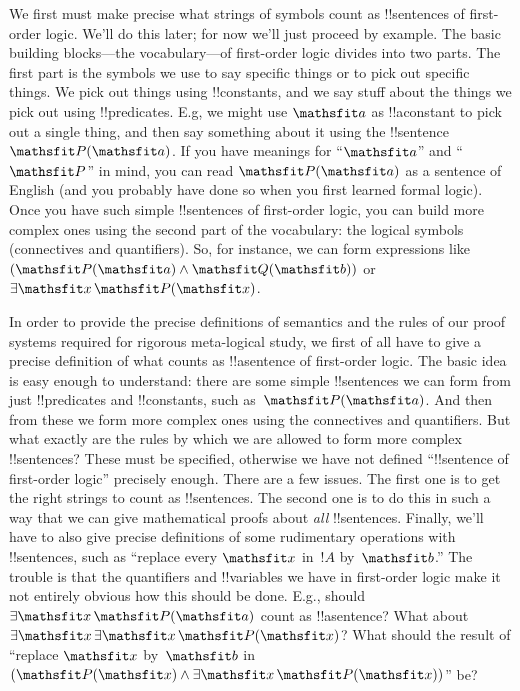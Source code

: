 \documentclass[../../../include/open-logic-section]{subfiles}
\begin{document}


We first must make precise what strings of symbols count as
!!{sentence}s of first-order logic.  We'll do this later; for now
we'll just proceed by example.  The basic building blocks---the
vocabulary---of first-order logic divides into two parts. The first
part is the symbols we use to say specific things or to pick out
specific things. We pick out things using !!{constant}s, and we say
stuff about the things we pick out using !!{predicate}s.  E.g, we
might use $\Obj a$ as !!a{constant} to pick out a single thing, and
then say something about it using the !!{sentence}~$\Atom{\Obj P}{\Obj
a}$.  If you have meanings for ``$\Obj a$'' and ``$\Obj P$'' in mind,
you can read $\Atom{\Obj P}{\Obj a}$ as a sentence of English (and you
probably have done so when you first learned formal logic).  Once you
have such simple !!{sentence}s of first-order logic, you can build
more complex ones using the second part of the vocabulary: the logical
symbols (connectives and quantifiers). So, for instance, we can form
expressions like $(\Atom{\Obj P}{\Obj a} \land \Atom{\Obj Q}{\Obj b})$
or~$\lexists[\Obj x][\Atom{\Obj P}{\Obj x}]$.

In order to provide the precise definitions of semantics and the rules
of our proof systems required for rigorous meta-logical study, we
first of all have to give a precise definition of what counts as
!!a{sentence} of first-order logic. The basic idea is easy enough to
understand: there are some simple !!{sentence}s we can form from just
!!{predicate}s and !!{constant}s, such as~$\Atom{\Obj P}{\Obj a}$. And
then from these we form more complex ones using the connectives and
quantifiers. But what exactly are the rules by which we are allowed to
form more complex !!{sentence}s?  These must be specified, otherwise
we have not defined ``!!{sentence} of first-order logic'' precisely
enough. There are a few issues. The first one is to get the right
strings to count as !!{sentence}s. The second one is to do this in
such a way that we can give mathematical proofs about \emph{all}
!!{sentence}s. Finally, we'll have to also give precise definitions of
some rudimentary operations with !!{sentence}s, such as ``replace
every $\Obj x$ in~$!A$ by~$\Obj b$.'' The trouble is that the
quantifiers and !!{variable}s we have in first-order logic make it not
entirely obvious how this should be done. E.g., should $\lexists[\Obj
x][\Atom{\Obj P}{\Obj a}]$ count as !!a{sentence}? What about
$\lexists[\Obj x][\lexists[\Obj x][\Atom{\Obj P}{\Obj x}]]$? What
should the result of ``replace $\Obj x$ by~$\Obj b$ in $(\Atom{\Obj
P}{\Obj x} \land \lexists[\Obj x][\Atom{\Obj P}{\Obj x}])$'' be?
\end{document}
